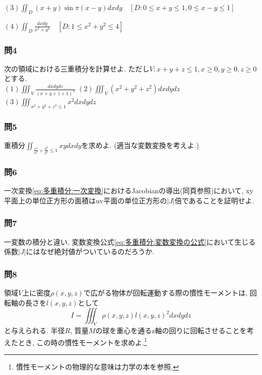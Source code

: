 \documentclass[a4j,dvipdfmx]{jsarticle}
\numberwithin{equation}{section}
\begin{document}
                \noindent
                $(3)\displaystyle \iint_D(x+y)\sin\pi(x-y)dxdy\quad [D:0\leq x+y\leq 1,0\leq x-y\leq 1]$

                \noindent
                $(4)\displaystyle\iint_D \frac{dxdy}{x^2+y^2} \quad [D:1\leq x^2+y^2\leq 4]$
            
            \subsubsection*{問4} 次の領域における三重積分を計算せよ. ただし$V:x+y+z\leq 1,x\geq 0, y\geq 0,z\geq 0$とする.\\
                $(1)\displaystyle \iiint_V \frac{dxdydz}{(x+y+z+1)^3}$\hspace{5mm}
                $(2)\displaystyle \iiint_V (x^2+y^2+z^2)dxdydz$\hspace{5mm}
                $(3)\displaystyle \iiint_{x^2+y^2+z^2\leq 1}x^2dxdydz$
    
            \subsubsection*{問5}重積分$\displaystyle\iint_{\frac{x^2}{a^2}+\frac{y^2}{b^2}\leq 1}xydxdy $を求めよ. (適当な変数変換を考えよ.)
            \vspace{-0.5cm}

            \subsubsection*{問6}一次変換\eqref{eq:多重積分:一次変換}におけるJacobianの導出(同頁参照)において, xy平面上の単位正方形の面積はuv平面の単位正方形の$|J|$倍であることを証明せよ.
            \vspace{-0.5cm} 

            \subsubsection*{問7}一変数の積分と違い, 変数変換公式\eqref{eq:多重積分:変数変換の公式}において生じる係数$|J|$にはなぜ絶対値がついているのだろうか.
            \vspace{-1cm} 

            \subsubsection*{問8}領域$V$上に密度$\rho(x,y,z)$で広がる物体が回転運動する際の慣性モーメントは, 回転軸の長さを$l(x,y,z)$として
                \begin{equation}
                    I=\iiint_{V}\rho(x,y,z)l(x,y,z)^2dxdydz
                \end{equation}
                と与えられる. 半径$R$, 質量$M$の球を重心を通るz軸の回りに回転させることを考えたとき, この時の慣性モーメントを求めよ.\footnote{慣性モーメントの物理的な意味は力学の本を参照.}
            \clearpage
    \clearpage
    
\end{document}
